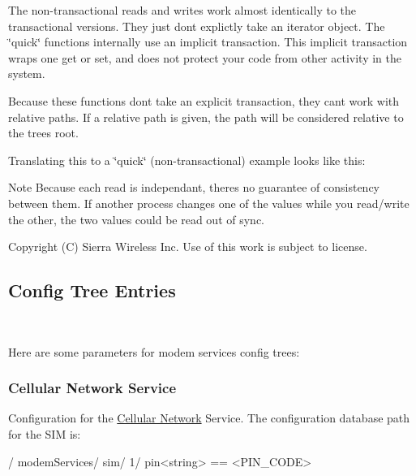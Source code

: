 The non-\/transactional reads and writes work almost identically to the transactional versions. They just don\textquotesingle{}t explictly take an iterator object. The \char`\"{}quick\char`\"{} functions internally use an implicit transaction. This implicit transaction wraps one get or set, and does not protect your code from other activity in the system.

Because these functions don\textquotesingle{}t take an explicit transaction, they can\textquotesingle{}t work with relative paths. If a relative path is given, the path will be considered relative to the tree\textquotesingle{}s root.

Translating this to a \char`\"{}quick\char`\"{} (non-\/transactional) example looks like this\+:




\begin{DoxyNote}{Note}
Because each read is independant, there\textquotesingle{}s no guarantee of consistency between them. If another process changes one of the values while you read/write the other, the two values could be read out of sync.
\end{DoxyNote}




Copyright (C) Sierra Wireless Inc. Use of this work is subject to license. \hypertarget{configTreePage}{}\subsection{Config Tree Entries}\label{configTreePage}
~\newline


Here are some parameters for modem services config trees\+:\hypertarget{config_tree_page_cellnetConfigTree}{}\subsubsection{Cellular Network Service}\label{config_tree_page_cellnetConfigTree}
Configuration for the \hyperlink{c_le_cellnet}{Cellular Network} Service. The configuration database path for the S\+I\+M is\+: \begin{DoxyVerb} /
     modemServices/
         sim/
             1/
                 pin<string> == <PIN_CODE>\end{DoxyVerb}



